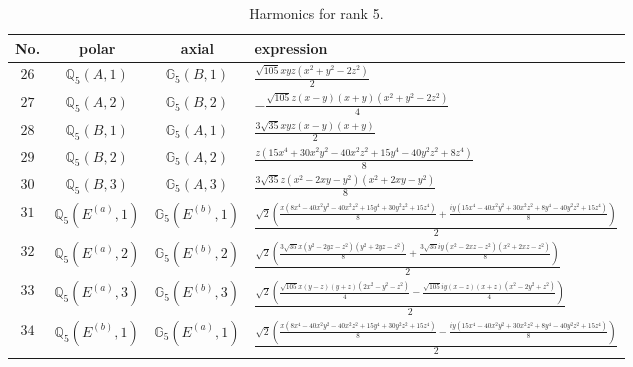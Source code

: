 \documentclass[fleqn,8pt,landscape]{jsarticle}
\begin{document}
\begin{table}[ht!]
\begin{center}
\caption{Harmonics for rank 5.}
\renewcommand{\arraystretch}{1.3}
\begin{tabular}{cccl} \hline \hline
No. & polar & axial & expression \\ \hline
$ 26 $ & $ \mathbb{Q}_{5}(A,1) $ & $ \mathbb{G}_{5}(B,1) $ & $ \frac{\sqrt{105} x y z \left(x^{2} + y^{2} - 2 z^{2}\right)}{2} $ \\
$ 27 $ & $ \mathbb{Q}_{5}(A,2) $ & $ \mathbb{G}_{5}(B,2) $ & $ - \frac{\sqrt{105} z \left(x - y\right) \left(x + y\right) \left(x^{2} + y^{2} - 2 z^{2}\right)}{4} $ \\
$ 28 $ & $ \mathbb{Q}_{5}(B,1) $ & $ \mathbb{G}_{5}(A,1) $ & $ \frac{3 \sqrt{35} x y z \left(x - y\right) \left(x + y\right)}{2} $ \\
$ 29 $ & $ \mathbb{Q}_{5}(B,2) $ & $ \mathbb{G}_{5}(A,2) $ & $ \frac{z \left(15 x^{4} + 30 x^{2} y^{2} - 40 x^{2} z^{2} + 15 y^{4} - 40 y^{2} z^{2} + 8 z^{4}\right)}{8} $ \\
$ 30 $ & $ \mathbb{Q}_{5}(B,3) $ & $ \mathbb{G}_{5}(A,3) $ & $ \frac{3 \sqrt{35} z \left(x^{2} - 2 x y - y^{2}\right) \left(x^{2} + 2 x y - y^{2}\right)}{8} $ \\
$ 31 $ & $ \mathbb{Q}_{5}(E^{(a)},1) $ & $ \mathbb{G}_{5}(E^{(b)},1) $ & $ \frac{\sqrt{2} \left(\frac{x \left(8 x^{4} - 40 x^{2} y^{2} - 40 x^{2} z^{2} + 15 y^{4} + 30 y^{2} z^{2} + 15 z^{4}\right)}{8} + \frac{i y \left(15 x^{4} - 40 x^{2} y^{2} + 30 x^{2} z^{2} + 8 y^{4} - 40 y^{2} z^{2} + 15 z^{4}\right)}{8}\right)}{2} $ \\
$ 32 $ & $ \mathbb{Q}_{5}(E^{(a)},2) $ & $ \mathbb{G}_{5}(E^{(b)},2) $ & $ \frac{\sqrt{2} \left(\frac{3 \sqrt{35} x \left(y^{2} - 2 y z - z^{2}\right) \left(y^{2} + 2 y z - z^{2}\right)}{8} + \frac{3 \sqrt{35} i y \left(x^{2} - 2 x z - z^{2}\right) \left(x^{2} + 2 x z - z^{2}\right)}{8}\right)}{2} $ \\
$ 33 $ & $ \mathbb{Q}_{5}(E^{(a)},3) $ & $ \mathbb{G}_{5}(E^{(b)},3) $ & $ \frac{\sqrt{2} \left(\frac{\sqrt{105} x \left(y - z\right) \left(y + z\right) \left(2 x^{2} - y^{2} - z^{2}\right)}{4} - \frac{\sqrt{105} i y \left(x - z\right) \left(x + z\right) \left(x^{2} - 2 y^{2} + z^{2}\right)}{4}\right)}{2} $ \\
$ 34 $ & $ \mathbb{Q}_{5}(E^{(b)},1) $ & $ \mathbb{G}_{5}(E^{(a)},1) $ & $ \frac{\sqrt{2} \left(\frac{x \left(8 x^{4} - 40 x^{2} y^{2} - 40 x^{2} z^{2} + 15 y^{4} + 30 y^{2} z^{2} + 15 z^{4}\right)}{8} - \frac{i y \left(15 x^{4} - 40 x^{2} y^{2} + 30 x^{2} z^{2} + 8 y^{4} - 40 y^{2} z^{2} + 15 z^{4}\right)}{8}\right)}{2} $ \\

\end{tabular}
\end{center}
\end{table}
\end{document}
